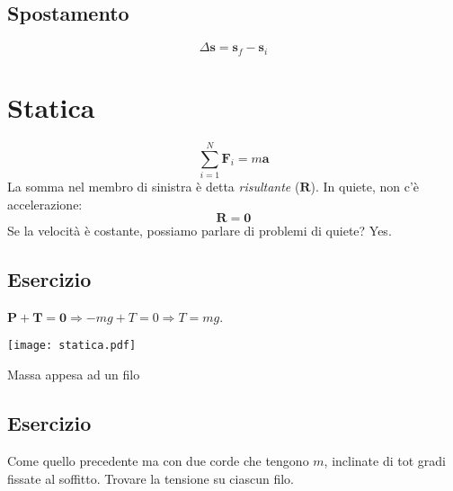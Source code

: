 
\subsection*{Spostamento}
\[ \Delta\mathbf{s} = \mathbf{s}_f - \mathbf{s}_i \]


\section*{Statica}
\[ \sum_{i = 1}^{N}\mathbf{F}_i = m\mathbf{a} \]
La somma nel membro di sinistra è detta \textit{risultante} ($\mathbf{R}$).
In quiete, non c'è accelerazione:
\[ \mathbf{R} = \mathbf{0} \]
Se la velocità è costante, possiamo parlare di problemi di quiete? Yes.

\subsection*{Esercizio}
$\mathbf{P} + \mathbf{T} = \mathbf{0} \Rightarrow -mg + T = 0 \Rightarrow T = mg$.

\begin{marginfigure}
    \centering
    \texttt{[image: statica.pdf]}
    \caption{Massa appesa ad un filo}
    \label{filo}
\end{marginfigure}

\subsection*{Esercizio}
Come quello precedente ma con due corde che tengono $m$, inclinate di
tot gradi fissate al soffitto. Trovare la tensione su ciascun filo.